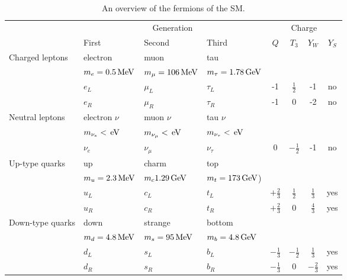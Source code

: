 \begin{table}[ht!]
\def\arraystretch{1.2}
\setlength{\belowcaptionskip}{6pt}
\small
\centering
\caption{An overview of the fermions of the SM.}
\label{tab:fermions}
\begin{tabular}{l l l l c c c c}
        \hline \hline
        & \multicolumn{3}{c}{Generation} &\multicolumn{4}{c}{Charge} \\
        & First & Second & Third & $Q$ & $T_{3}$ & $Y_{W}$ & $Y_{S}$ \\\hline
\multirow{4}{*}{Charged leptons}& electron & muon & tau&  & & & \\
                        & $m_{e} = 0.5\,\text{Me\hspace{-.08em}V}$ & $m_{\mu} = 106\,\text{Me\hspace{-.08em}V}$ & $m_{\tau}=1.78\,\text{Ge\hspace{-.08em}V}$&  & & & \\
                        & $e_{L}$ & $\mu_{L}$ & $\tau_{L}$ & -1 & $\frac{1}{2}$ & -1 & no\\
                        & $e_{R}$ & $\mu_{R}$ & $\tau_{R}$ & -1 & 0             & -2 & no\\\hline
\multirow{3}{*}{Neutral leptons}& electron $\nu$ & muon $\nu$ & tau $\nu$&  & & & \\
                        & $m_{\nu_{e}}<\,\text{e\hspace{-.08em}V}$& $m_{\nu_{\mu}}<\,\text{e\hspace{-.08em}V}$ & $m_{\nu_{\tau}}<\,\text{e\hspace{-.08em}V}$&  & & & \\
                        & $\nu_{e}$ & $\nu_{\mu}$ & $\nu_{\tau}$ & 0 & $-\frac{1}{2}$ & -1 & no\\\hline
\multirow{4}{*}{Up-type quarks} & up& charm& top &  & & & \\
                        & $m_{u}=2.3\,\text{Me\hspace{-.08em}V}$& $m_{c}1.29\,\text{Ge\hspace{-.08em}V}$& $m_{t}=173\,\text{Ge\hspace{-.08em}V}$)&  & & & \\
                        & $u_{L}$ & $c_{L}$ & $t_{L}$ & $+\frac{2}{3}$ & $\frac{1}{2}$ & $\frac{1}{3}$ & yes\\
                        & $u_{R}$ & $c_{R}$ & $t_{R}$ & $+\frac{2}{3}$ & 0 & $\frac{4}{3}$ & yes\\\hline
\multirow{4}{*}{Down-type quarks} & down & strange& bottom&  & & & \\
                        & $m_{d}=4.8\,\text{Me\hspace{-.08em}V}$   & $m_{s}=95\,\text{Me\hspace{-.08em}V}$           & $m_{b}=4.8\,\text{Ge\hspace{-.08em}V}$&  & & & \\
                        & $d_{L}$ & $s_{L}$ & $b_{L}$ & $-\frac{1}{3}$ & $-\frac{1}{2}$ & $\frac{1}{3}$ & yes\\
                        & $d_{R}$ & $s_{R}$ & $b_{R}$ & $-\frac{1}{3}$ & 0 & $-\frac{2}{3}$ & yes\\\hline
\hline
\end{tabular}
\end{table}                                                                                                              
